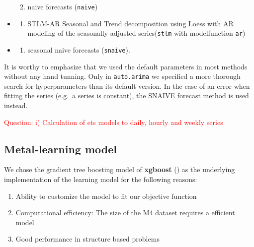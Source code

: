 \documentclass[11pt,a4paper,]{article}
\providecommand{\tightlist}{%
  \setlength{\itemsep}{0pt}\setlength{\parskip}{0pt}}
\theoremstyle{definition}
\theoremstyle{definition}
\theoremstyle{definition}
\theoremstyle{remark}
\begin{document}
\begin{itemize}
  \begin{enumerate}
  \def\labelenumi{\roman{enumi})}
  \setcounter{enumi}{6}
  \tightlist
  \item
    naive forecasts (\texttt{naive})
  \end{enumerate}
\item
  \begin{enumerate}
  \def\labelenumi{\roman{enumi})}
  \setcounter{enumi}{7}
  \tightlist
  \item
    STLM-AR Seasonal and Trend decomposition using Loess with AR
    modeling of the seasonally adjusted series(\texttt{stlm} with
    modelfunction \texttt{ar})
  \end{enumerate}
\item
  \begin{enumerate}
  \def\labelenumi{\roman{enumi})}
  \setcounter{enumi}{8}
  \tightlist
  \item
    seasonal naive forecasts (\texttt{snaive}).
  \end{enumerate}
\end{itemize}

It is worthy to emphasize that we used the default parameters in most
methods without any hand tunning. Only in \texttt{auto.arima} we
specified a more thorough search for hyperparameters than its default
version. In the case of an error when fitting the series (e.g.~a series
is constant), the SNAIVE forecast method is used instead.

\textcolor{red}{Question: i) Calculation of ets models to daily, hourly and weekly series}

\subsection{Metal-learning model}\label{metal-learning-model}

We chose the gradient tree boosting model of \textbf{xgboost}
(\textcite{chen2016xgboost}) as the underlying implementation of the
learning model for the following reasons:

\begin{enumerate}
\def\labelenumi{\arabic{enumi}.}
\tightlist
\item
  Ability to customize the model to fit our objective function
\item
  Computational efficiency: The size of the M4 dataset requires a
  efficient model
\item
  Good performance in structure based problems
\end{enumerate}
\end{document}
